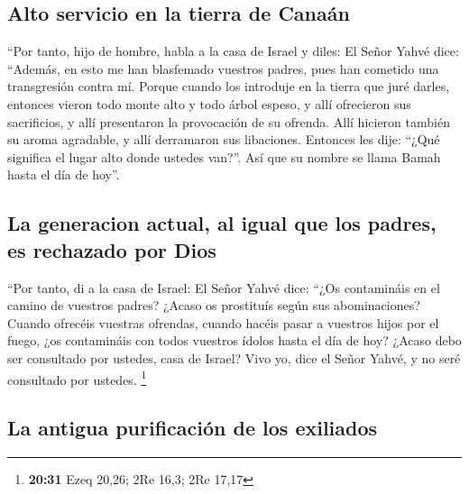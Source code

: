\hypertarget{alto-servicio-en-la-tierra-de-canauxe1n}{%
\subsection{Alto servicio en la tierra de
Canaán}\label{alto-servicio-en-la-tierra-de-canauxe1n}}

 ``Por tanto, hijo de hombre, habla a la casa de Israel y
diles: El Señor Yahvé dice: ``Además, en esto me han blasfemado vuestros
padres, pues han cometido una transgresión contra mí. 
Porque cuando los introduje en la tierra que juré darles, entonces
vieron todo monte alto y todo árbol espeso, y allí ofrecieron sus
sacrificios, y allí presentaron la provocación de su ofrenda. Allí
hicieron también su aroma agradable, y allí derramaron sus libaciones.
 Entonces les dije: ``¿Qué significa el lugar alto donde
ustedes van?''. Así que su nombre se llama Bamah hasta el día de hoy''.

\hypertarget{la-generacion-actual-al-igual-que-los-padres-es-rechazado-por-dios}{%
\subsection{La generacion actual, al igual que los padres, es rechazado
por
Dios}\label{la-generacion-actual-al-igual-que-los-padres-es-rechazado-por-dios}}

 ``Por tanto, di a la casa de Israel: El Señor Yahvé
dice: ``¿Os contamináis en el camino de vuestros padres? ¿Acaso os
prostituís según sus abominaciones?  Cuando ofrecéis
vuestras ofrendas, cuando hacéis pasar a vuestros hijos por el fuego,
¿os contamináis con todos vuestros ídolos hasta el día de hoy? ¿Acaso
debo ser consultado por ustedes, casa de Israel? Vivo yo, dice el Señor
Yahvé, y no seré consultado por ustedes. \footnote{\textbf{20:31} Ezeq
  20,26; 2Re 16,3; 2Re 17,17}

\hypertarget{la-antigua-purificaciuxf3n-de-los-exiliados}{%
\subsection{La antigua purificación de los
exiliados}\label{la-antigua-purificaciuxf3n-de-los-exiliados}}

